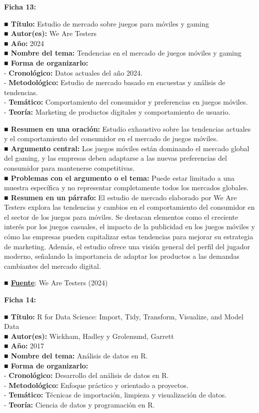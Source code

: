 \documentclass[
  letterpaper,
  DIV=11,
  numbers=noendperiod]{scrreprt}
\begin{document}
\textbf{Ficha 13:}

\textbf{■ Título:} Estudio de mercado sobre juegos para móviles y
gaming\\
\textbf{■ Autor(es):} We Are Testers\\
\textbf{■ Año:} 2024\\
\textbf{■ Nombre del tema:} Tendencias en el mercado de juegos móviles y
gaming\\
\textbf{■ Forma de organizarlo:}\\
- \textbf{Cronológico:} Datos actuales del año 2024.\\
- \textbf{Metodológico:} Estudio de mercado basado en encuestas y
análisis de tendencias.\\
- \textbf{Temático:} Comportamiento del consumidor y preferencias en
juegos móviles.\\
- \textbf{Teoría:} Marketing de productos digitales y comportamiento de
usuario.

\textbf{■ Resumen en una oración:} Estudio exhaustivo sobre las
tendencias actuales y el comportamiento del consumidor en el mercado de
juegos móviles.\\
\textbf{■ Argumento central:} Los juegos móviles están dominando el
mercado global del gaming, y las empresas deben adaptarse a las nuevas
preferencias del consumidor para mantenerse competitivas.\\
\textbf{■ Problemas con el argumento o el tema:} Puede estar limitado a
una muestra específica y no representar completamente todos los mercados
globales.\\
\textbf{■ Resumen en un párrafo:} El estudio de mercado elaborado por We
Are Testers explora las tendencias y cambios en el comportamiento del
consumidor en el sector de los juegos para móviles. Se destacan
elementos como el creciente interés por los juegos casuales, el impacto
de la publicidad en los juegos móviles y cómo las empresas pueden
capitalizar estas tendencias para mejorar su estrategia de marketing.
Además, el estudio ofrece una visión general del perfil del jugador
moderno, señalando la importancia de adaptar los productos a las
demandas cambiantes del mercado digital.

\textbf{■
\href{https://www.wearetesters.com/estudios-de-mercado/gaming/}{Fuente}}:
We Are Testers (2024)

\textbf{Ficha 14:}

\textbf{■ Título:} R for Data Science: Import, Tidy, Transform,
Visualize, and Model Data\\
\textbf{■ Autor(es):} Wickham, Hadley y Grolemund, Garrett\\
\textbf{■ Año:} 2017\\
\textbf{■ Nombre del tema:} Análisis de datos en R.\\
\textbf{■ Forma de organizarlo:}\\
- \textbf{Cronológico:} Desarrollo del análisis de datos en R.\\
- \textbf{Metodológico:} Enfoque práctico y orientado a proyectos.\\
- \textbf{Temático:} Técnicas de importación, limpieza y visualización
de datos.\\
- \textbf{Teoría:} Ciencia de datos y programación en R.
\end{document}
